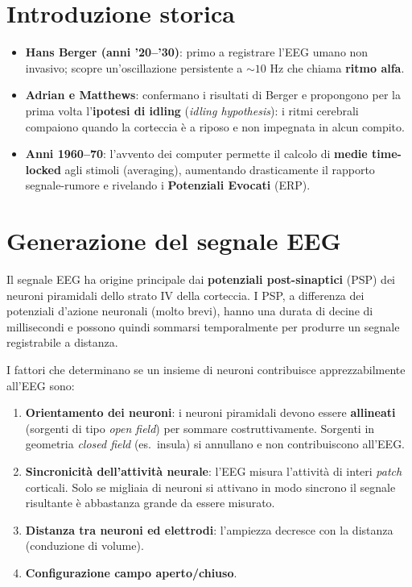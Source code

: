 \section{Introduzione storica}

\begin{itemize}
    \item \textbf{Hans Berger (anni '20--'30)}: primo a registrare l'EEG umano non invasivo; scopre un'oscillazione persistente a $\sim 10$ Hz che chiama \textbf{ritmo alfa}.
    \item \textbf{Adrian e Matthews}: confermano i risultati di Berger e propongono per la prima volta l'\textbf{ipotesi di idling} (\textit{idling hypothesis}): i ritmi cerebrali compaiono quando la corteccia è a riposo e non impegnata in alcun compito.
    \item \textbf{Anni 1960--70}: l'avvento dei computer permette il calcolo di \textbf{medie time-locked} agli stimoli (averaging), aumentando drasticamente il rapporto segnale-rumore e rivelando i \textbf{Potenziali Evocati} (ERP).
\end{itemize}

\section{Generazione del segnale EEG}

Il segnale EEG ha origine principale dai \textbf{potenziali post-sinaptici} (PSP) dei neuroni piramidali dello strato IV della corteccia. I PSP, a differenza dei potenziali d'azione neuronali (molto brevi), hanno una durata di decine di millisecondi e possono quindi sommarsi temporalmente per produrre un segnale registrabile a distanza.

I fattori che determinano se un insieme di neuroni contribuisce apprezzabilmente all'EEG sono:
\begin{enumerate}
    \item \textbf{Orientamento dei neuroni}: i neuroni piramidali devono essere \textbf{allineati} (sorgenti di tipo \textit{open field}) per sommare costruttivamente. Sorgenti in geometria \textit{closed field} (es.\ insula) si annullano e non contribuiscono all'EEG.
    \item \textbf{Sincronicità dell'attività neurale}: l'EEG misura l'attività di interi \textit{patch} corticali. Solo se migliaia di neuroni si attivano in modo sincrono il segnale risultante è abbastanza grande da essere misurato.
    \item \textbf{Distanza tra neuroni ed elettrodi}: l'ampiezza decresce con la distanza (conduzione di volume).
    \item \textbf{Configurazione campo aperto/chiuso}.
\end{enumerate}

